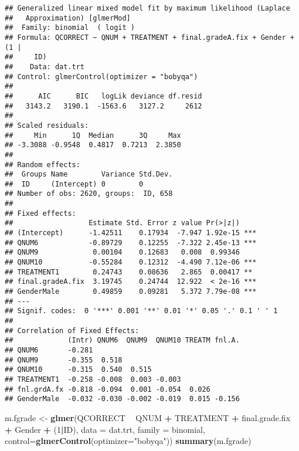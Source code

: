 \documentclass[]{article}
\newenvironment{Shaded}{\begin{snugshade}}{\end{snugshade}}
\newcommand{\KeywordTok}[1]{\textcolor[rgb]{0.13,0.29,0.53}{\textbf{#1}}}
\newcommand{\DataTypeTok}[1]{\textcolor[rgb]{0.13,0.29,0.53}{#1}}
\newcommand{\DecValTok}[1]{\textcolor[rgb]{0.00,0.00,0.81}{#1}}
\newcommand{\StringTok}[1]{\textcolor[rgb]{0.31,0.60,0.02}{#1}}
\newcommand{\OperatorTok}[1]{\textcolor[rgb]{0.81,0.36,0.00}{\textbf{#1}}}
\newcommand{\NormalTok}[1]{#1}
\begin{document}
\begin{verbatim}
## Generalized linear mixed model fit by maximum likelihood (Laplace
##   Approximation) [glmerMod]
##  Family: binomial  ( logit )
## Formula: QCORRECT ~ QNUM + TREATMENT + final.gradeA.fix + Gender + (1 |  
##     ID)
##    Data: dat.trt
## Control: glmerControl(optimizer = "bobyqa")
## 
##      AIC      BIC   logLik deviance df.resid 
##   3143.2   3190.1  -1563.6   3127.2     2612 
## 
## Scaled residuals: 
##     Min      1Q  Median      3Q     Max 
## -3.3088 -0.9548  0.4817  0.7213  2.3850 
## 
## Random effects:
##  Groups Name        Variance Std.Dev.
##  ID     (Intercept) 0        0       
## Number of obs: 2620, groups:  ID, 658
## 
## Fixed effects:
##                  Estimate Std. Error z value Pr(>|z|)    
## (Intercept)      -1.42511    0.17934  -7.947 1.92e-15 ***
## QNUM6            -0.89729    0.12255  -7.322 2.45e-13 ***
## QNUM9             0.00104    0.12683   0.008  0.99346    
## QNUM10           -0.55284    0.12312  -4.490 7.12e-06 ***
## TREATMENT1        0.24743    0.08636   2.865  0.00417 ** 
## final.gradeA.fix  3.19745    0.24744  12.922  < 2e-16 ***
## GenderMale        0.49859    0.09281   5.372 7.79e-08 ***
## ---
## Signif. codes:  0 '***' 0.001 '**' 0.01 '*' 0.05 '.' 0.1 ' ' 1
## 
## Correlation of Fixed Effects:
##             (Intr) QNUM6  QNUM9  QNUM10 TREATM fnl.A.
## QNUM6       -0.281                                   
## QNUM9       -0.355  0.518                            
## QNUM10      -0.315  0.540  0.515                     
## TREATMENT1  -0.258 -0.008  0.003 -0.003              
## fnl.grdA.fx -0.818 -0.094  0.001 -0.054  0.026       
## GenderMale  -0.032 -0.030 -0.002 -0.019  0.015 -0.156
\end{verbatim}

\begin{Shaded}
\begin{Highlighting}[]
\NormalTok{m.fgrade <-}\StringTok{ }\KeywordTok{glmer}\NormalTok{(QCORRECT }\OperatorTok{~}\StringTok{ }\NormalTok{QNUM }\OperatorTok{+}\StringTok{ }\NormalTok{TREATMENT }\OperatorTok{+}\StringTok{ }\NormalTok{final.grade.fix }\OperatorTok{+}\StringTok{ }\NormalTok{Gender }\OperatorTok{+}\StringTok{ }\NormalTok{(}\DecValTok{1}\OperatorTok{|}\NormalTok{ID), }
                \DataTypeTok{data =}\NormalTok{ dat.trt, }
                \DataTypeTok{family =}\NormalTok{ binomial, }\DataTypeTok{control=}\KeywordTok{glmerControl}\NormalTok{(}\DataTypeTok{optimizer=}\StringTok{"bobyqa"}\NormalTok{))}
\KeywordTok{summary}\NormalTok{(m.fgrade)}
\end{Highlighting}
\end{Shaded}
\end{document}
